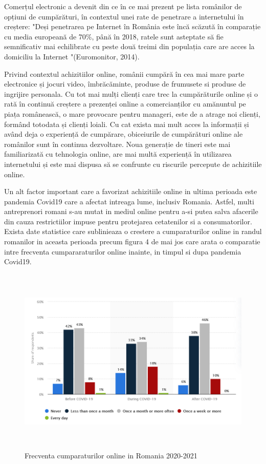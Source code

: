 \documentclass[a4paper, 12pt]{article}
\begin{document}
	\qquad Comerțul electronic a devenit din ce în ce mai prezent pe lista românilor de opțiuni de cumpărături, în contextul unei rate de penetrare a internetului în creștere: "Deși penetrarea pe Internet în România este încă scăzută în comparație cu media europeană de 70\%, până în 2018, ratele sunt asteptate să fie semnificativ mai echilibrate cu peste două treimi din populația care are acces la domiciliu la Internet "(Euromonitor, 2014).
	
	\quad Privind contextul achizitiilor online, românii cumpără în cea mai mare parte electronice și jocuri video, îmbrăcăminte, produse de frumusete si produse de ingrijire personala. Cu tot mai mulți clienți care trec la cumpărăturile online și o rată în continuă creștere a prezenței online a comercianților cu amănuntul pe piața românească, o mare provocare pentru manageri, este de a atrage noi clienți, formând  totodata și clienți loiali. Cu cat exista mai mult acces la informații și având deja o experiență de cumpărare, obiceiurile de cumpărături online ale românilor sunt în continua dezvoltare. Noua generație de tineri este mai familiarizată cu tehnologia online, are mai multă experiență în utilizarea internetului și este mai dispusa să se confrunte cu riscurile percepute de achizitiile online.
	
	\quad Un alt factor important care a favorizat achizitiile online in ultima perioada este pandemia Covid19 care a afectat intreaga lume, inclusiv Romania. Astfel, multi antreprenori romani s-au mutat in mediul online pentru a-si putea salva afacerile din cauza restrictiilor impuse pentru protejarea cetatenilor si a consumatorilor.
	 Exista date statistice care sublinieaza o crestere a cumparaturilor online in randul romanilor in aceasta perioada precum figura 4 de mai jos care arata o comparatie intre frecventa cumpararaturilor online inainte, in timpul si dupa pandemia Covid19.
	 	\begin{figure}[!htb]
	 	\centering
	 	\includegraphics[width=13cm, height=9cm]{"figures/fourth.png"}
	 	\caption{ Frecventa cumparaturilor online in Romania 2020-2021}\label{fig:fourth}
		 \end{figure}
 
\end{document}
